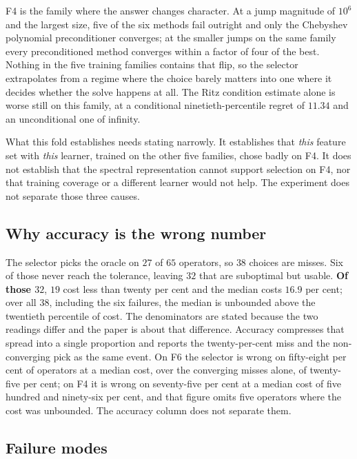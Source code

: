 \documentclass[11pt]{article}
\begin{document}
F4 is the family where the answer changes character. At a jump magnitude of $10^{6}$ and the largest
size, five of the six methods fail outright and only the Chebyshev polynomial
preconditioner converges; at the smaller jumps on the same family every
preconditioned method converges within a factor of four of the best. Nothing in the five
training families contains that flip, so the selector extrapolates from a regime
where the choice barely matters into one where it decides whether the solve
happens at all. The Ritz condition estimate alone is worse still on this family, at a
conditional ninetieth-percentile regret of $11.34$ and an unconditional one of infinity.

What this fold establishes needs stating narrowly. It establishes that \emph{this} feature
set with \emph{this} learner, trained on the other five families, chose badly on F4. It
does not establish that the spectral representation cannot support selection on F4, nor
that training coverage or a different learner would not help. The experiment does not
separate those three causes.

\subsection{Why accuracy is the wrong number}
\label{sec:misses}

The selector picks the oracle on $27$ of $65$ operators, so $38$ choices are
misses. Six of those never reach the tolerance, leaving $32$ that are suboptimal but
usable. \textbf{Of those $32$}, $19$ cost less than twenty per cent and the median costs
$16.9$ per cent; over all $38$, including the six failures, the median is unbounded above
the twentieth percentile of cost. The denominators are stated because the two readings
differ and the paper is about that difference. Accuracy compresses that spread into a
single proportion and reports the twenty-per-cent miss and the non-converging
pick as the same event. On F6 the selector is wrong on fifty-eight per cent of
operators at a median cost, over the converging misses alone, of twenty-five per cent; on
F4 it is wrong on seventy-five per cent at a median cost of five hundred and ninety-six
per cent, and that figure omits five operators where the cost was unbounded. The
accuracy column does not separate them.

\subsection{Failure modes}
\end{document}
